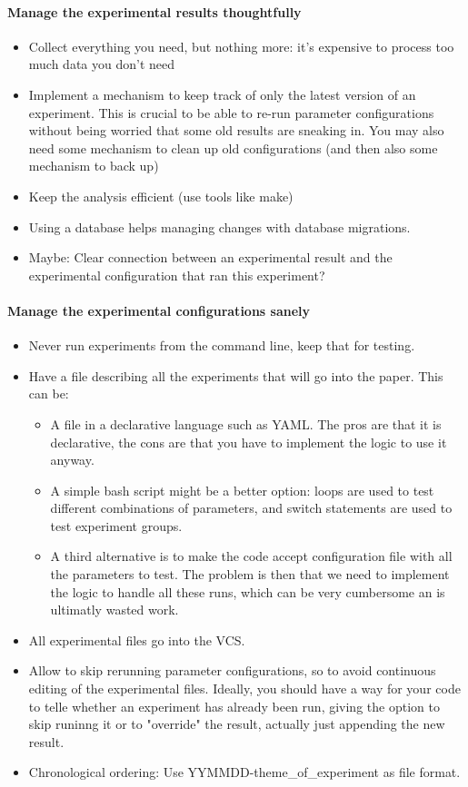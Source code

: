 \documentclass{llncs}
\begin{document}
\paragraph{Manage the experimental results thoughtfully}

\begin{itemize}
\item Collect everything you need, but nothing more: it's expensive to process too
  much data you don't need
\item Implement a mechanism to keep track of only the latest version of an
  experiment. This is crucial to be able to re-run parameter configurations
  without being worried that some old results are sneaking in. You may also
  need some mechanism to clean up old configurations (and then also some
  mechanism to back up)
\item Keep the analysis efficient (use tools like make)
\item Using a database helps managing changes with database migrations.
\item Maybe: Clear connection between an experimental result and the experimental configuration that ran this experiment?
\end{itemize}

\paragraph{Manage the experimental configurations sanely}

\begin{itemize}
\item Never run experiments from the command line, keep that for testing.
\item Have a file describing all the experiments that will go into the paper. This
  can be:
  \begin{itemize}
  \item A file in a declarative language such as YAML. The pros are that it is
    declarative, the cons are that you have to implement the logic to use it
    anyway.
  \item A simple bash script might be a better option: loops are used to test
      different combinations of parameters, and switch statements are used to
      test experiment groups.
  \item A third alternative is to make the code accept configuration file with all
      the parameters to test. The problem is then that we need to implement the
      logic to handle all these runs, which can be very cumbersome an is
      ultimatly wasted work.
  \end{itemize}
\item All experimental files go into the VCS. 
\item Allow to skip rerunning parameter configurations, so to avoid continuous
  editing of the experimental files. Ideally, you should have a way for your
  code to telle whether an experiment has already been run, giving the option
  to skip runinng it or to "override" the result, actually just appending the
  new result.
 \item Chronological ordering: Use YYMMDD-theme\_of\_experiment as file format.
\end{itemize}
\end{document}
